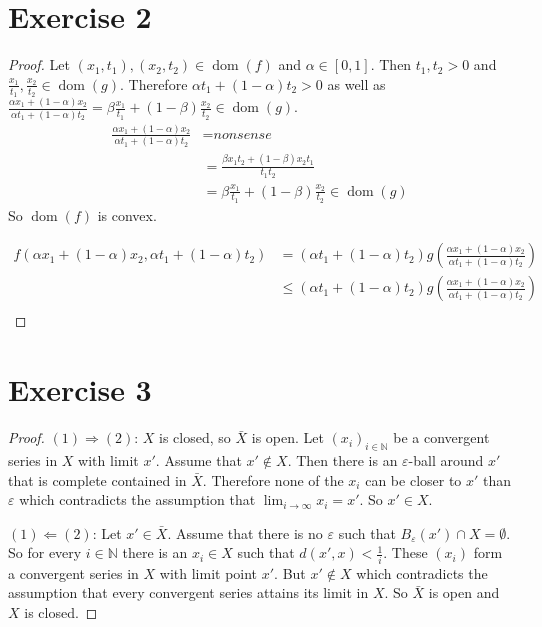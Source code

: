 \documentclass[10pt,a4paper]{article}
\DeclareMathOperator{\dom}{dom}
\begin{document}
\section*{Exercise 2}

\begin{proof}
  Let $(x_{1}, t_{1}), (x_{2}, t_{2}) \in \dom(f)$ and $\alpha \in [0, 1]$.
  Then $t_{1}, t_{2} > 0$ and $\frac{x_{1}}{t_{1}}, \frac{x_{2}}{t_{2}} \in \dom(g)$.
  Therefore $\alpha t_{1} + (1 - \alpha) t_{2} > 0$ as well as $\frac{\alpha x_{1} + (1 - \alpha) x_{2}}{\alpha t_{1} + (1 - \alpha) t_{2}} = \beta \frac{x_{1}}{t_{1}} + (1 - \beta) \frac{x_{2}}{t_{2}} \in \dom(g)$.
  \begin{align*}
    \frac{\alpha x_{1} + (1 - \alpha) x_{2}}{\alpha t_{1} + (1 - \alpha) t_{2}} & = \textit{nonsense}\\
                                                                                & = \frac{\beta x_{1} t_{2} + (1 - \beta) x_{2} t_{1}}{t_{1}t_{2}}\\
                                                                                & = \beta \frac{x_{1}}{t_{1}} + (1 - \beta) \frac{x_{2}}{t_{2}} \in \dom(g)
  \end{align*}
  So $\dom(f)$ is convex.

  \begin{align*}
    f(\alpha x_{1} + (1 - \alpha)x_{2}, \alpha t_{1} + (1 - \alpha)t_{2}) & = (\alpha t_{1} + (1 - \alpha)t_{2}) g\left( \frac{\alpha x_{1} + (1 - \alpha)x_{2}}{\alpha t_{1} + (1 - \alpha)t_{2}} \right)\\
                                                                          & \le (\alpha t_{1} + (1 - \alpha)t_{2}) g\left( \frac{\alpha x_{1} + (1 - \alpha)x_{2}}{\alpha t_{1} + (1 - \alpha)t_{2}} \right)\\
  \end{align*}
\end{proof}

\section*{Exercise 3}

\begin{proof}
  $(1) \Rightarrow (2)$: $X$ is closed, so $\bar{X}$ is open.
  Let $(x_{i})_{i \in \mathbb{N}}$ be a convergent series in $X$ with limit $x'$.
  Assume that $x' \not\in X$.
  Then there is an $\varepsilon$-ball around $x'$ that is complete contained in $\bar{X}$.
  Therefore none of the $x_{i}$ can be closer to $x'$ than $\varepsilon$ which contradicts the assumption that $\lim_{i \rightarrow \infty} x_{i} = x'$.
  So $x' \in X$.

  $(1) \Leftarrow (2)$: Let $x' \in \bar{X}$.
  Assume that there is no $\varepsilon$ such that $B_{\varepsilon}(x') \cap X = \emptyset$.
  So for every $i \in \mathbb{N}$ there is an $x_{i} \in X$ such that $d(x', x) < \frac{1}{i}$.
  These $(x_{i})$ form a convergent series in $X$ with limit point $x'$.
  But $x' \not\in X$ which contradicts the assumption that every convergent series attains its limit in $X$.
  So $\bar{X}$ is open and $X$ is closed.
\end{proof}
\end{document}
